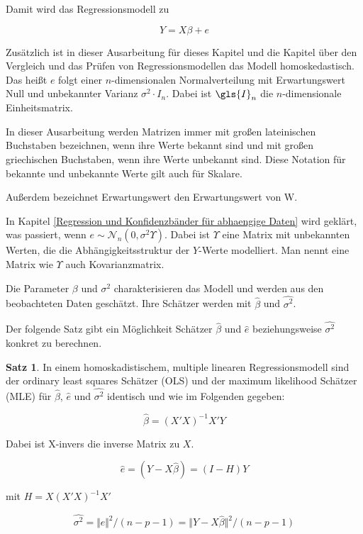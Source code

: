 \documentclass[12pt,a4paper]{article}
\theoremstyle{definition}
\theoremstyle{definition}
\newtheorem{Satz}[Definition]{Satz}
\theoremstyle{definition}
\begin{document}
Damit wird das Regressionsmodell zu

\begin{equation}
Y = X \beta + e \label{Grundmodell_Regression}
\end{equation}

Zusätzlich ist in dieser Ausarbeitung für dieses Kapitel und die Kapitel über den Vergleich und das Prüfen von Regressionsmodellen das Modell homoskedastisch. Das heißt $e$ folgt einer $n$-dimensionalen Normalverteilung mit Erwartungswert Null und unbekannter Varianz $\sigma^2 \cdot I_n$. Dabei ist $\gls{I}_n$ die $n$-dimensionale Einheitsmatrix. 

In dieser Ausarbeitung werden \gls{Matrizen} immer mit großen lateinischen Buchstaben bezeichnen, wenn ihre Werte bekannt sind und mit großen griechischen Buchstaben, wenn ihre Werte unbekannt sind. Diese Notation für bekannte und unbekannte Werte gilt auch für Skalare. 

Außerdem bezeichnet \gls{Erwartungswert} den Erwartungswert von W.

In Kapitel \ref{Regression und Konfidenzbänder für abhaengige Daten} wird geklärt, was passiert, wenn $e \sim \mathscr{N}_{n}(0,\sigma^2 \Upsilon)$. Dabei ist $\Upsilon$ eine Matrix mit unbekannten Werten, die die Abhängigkeitsstruktur der $Y$-Werte modelliert. Man nennt eine Matrix wie $\Upsilon$ auch Kovarianzmatrix.

Die Parameter $\beta$ und $\sigma^2$ charakterisieren das Modell und werden aus den beobachteten Daten geschätzt. Ihre Schätzer werden mit $\hat{\beta}$ und $\widehat{\sigma^2}$.

Der folgende Satz gibt ein Möglichkeit Schätzer $\hat{\beta}$ und $\hat{e}$ beziehungsweise $\widehat{\sigma^2}$ konkret zu berechnen.

\begin{Satz}
In einem homoskadistischem, multiple linearen Regressionsmodell sind der ordinary least squares Schätzer (OLS) und der maximum likelihood Schätzer (MLE) für $\hat{\beta}$, $\hat{e}$ und $\widehat{\sigma^2}$ identisch und wie im Folgenden gegeben:

\begin{equation} \label{beta}
\hat{\beta} = (X'X)^{-1} X' Y
\end{equation}

Dabei ist \gls{X-invers} die inverse Matrix zu $X$.

\begin{equation} \label{e}
\hat{e} = (Y-X \hat{\beta}) = (I-H)Y
\end{equation}

mit $H=X(X'X)^{-1}X'$

\begin{equation} \label{sigma}
\widehat{\sigma^2} = \Vert \hat{e} \Vert^{2} / (n-p-1) = \Vert Y - X \hat{\beta} \Vert^{2} / (n-p-1)
\end{equation}

\end{Satz}
\end{document}
